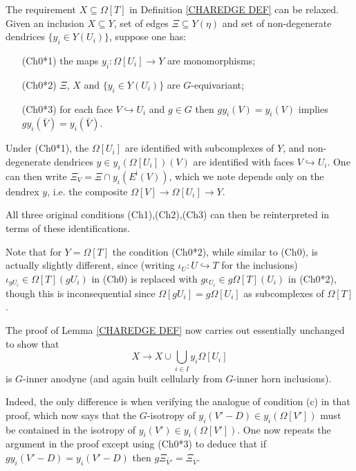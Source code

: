 \documentclass[a4paper,10pt,draft]{article}%
\numberwithin{equation}{section}%
\numberwithin{figure}{section}
\begin{document}
\begin{remark}\label{CHAREDGE2 REM}
The requirement $X \subseteq \Omega[T]$ in Definition \ref{CHAREDGE DEF} can be relaxed.
Given an inclusion $X \subseteq Y$,
set of edges $\Xi \subseteq Y(\eta)$ and 
set of non-degenerate dendrices $\{y_i \in Y(U_i)\}$, suppose one has:
\begin{itemize}
	\item[(Ch0*1)] the maps $y_i \colon \Omega[U_i] \to Y$ are monomorphisms;
	\item[(Ch0*2)] $\Xi$, $X$ and $\{y_i \in Y(U_i)\}$ are $G$-equivariant;
	\item[(Ch0*3)] for each face $V \hookrightarrow U_i$ and $g \in G$
	then $g y_i(V) = y_i(V)$ implies 
	$g y_i(\bar{V}) = y_i(\bar{V})$.
\end{itemize}
Under (Ch0*1),
the $\Omega[U_i]$ are identified with subcomplexes of $Y$,
and non-degenerate dendrices $y \in y_i(\Omega[U_i])(V)$
are identified with faces $V \hookrightarrow U_i$.
One can then write $\Xi_V = \Xi \cap y_i(E^{\mathsf{i}}(V))$,
which we note depends only on the dendrex $y$, 
i.e. the composite $\Omega[V] \to \Omega[U_i] \to Y$.

All three original conditions (Ch1),(Ch2),(Ch3)
can then be reinterpreted in terms of these identifications.

Note that for $Y = \Omega[T]$ the condition (Ch0*2), while similar to (Ch0), is actually slightly different, 
since (writing $\iota_U \colon U \hookrightarrow T$ for the inclusions) $\iota_{g U_i} \in \Omega[T](g U_i)$ in (Ch0)
is replaced with $g \iota_{U_i} \in g\Omega[T](U_i)$ in (Ch0*2),
though this is inconsequential since
$\Omega[gU_i] = g\Omega[U_i]$ as subcomplexes of $\Omega[T]$.

The proof of Lemma \ref{CHAREDGE DEF} now carries out essentially unchanged to show that 
\begin{equation}
	X \to X \cup \bigcup_{i \in I} y_i\Omega[U_i]
\end{equation}
is $G$-inner anodyne (and again built cellularly from $G$-inner horn inclusions).

Indeed, the only difference is when verifying the analogue of condition (c) in that proof,
which now says that the $G$-isotropy of 
$y_i(V'-D) \in y_i(\Omega[V'])$ must be contained in the isotropy of
$y_i(V') \in y_i(\Omega[V'])$.
One now repeats the argument in the proof except using (Ch0*3)
to deduce that if
$g y_i(V'-D) = y_i(V'-D)$
then $g\Xi_{\bar{V}'} = \Xi_{\bar{V}}$.
\end{remark}
\end{document}
